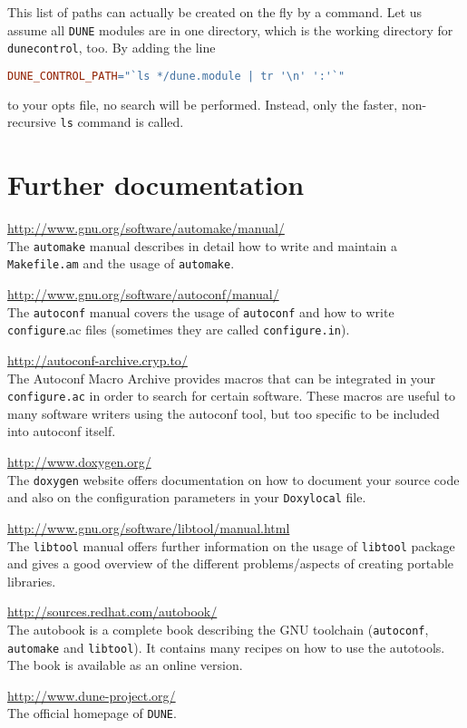 \documentclass[11pt,a4paper,headinclude,footinclude,DIV16,normalheadings]{scrartcl}
\newcommand{\dune}{\texttt{DUNE}\xspace}
\newcommand{\autoconf}{\texttt{autoconf}\xspace}
\newcommand{\automake}{\texttt{automake}\xspace}
\newcommand{\libtool}{\texttt{libtool}\xspace}
\newcommand{\configure}{\texttt{configure}\xspace}
\newcommand{\configureac}{\texttt{configure.ac}\xspace}
\newcommand{\makefileam}{\texttt{Makefile.am}\xspace}
\newcommand{\dunecontrol}{\texttt{dunecontrol}\xspace}
\begin{document}
This list of paths can actually be created on the fly by a command.
Let us assume all \dune modules are in one directory, which is the working directory 
for \dunecontrol, too. By adding the line
\begin{lstlisting}[language=make,showstringspaces=false]
DUNE_CONTROL_PATH="`ls */dune.module | tr '\n' ':'`"
\end{lstlisting}
to your opts file, no search will be performed.  Instead, only the faster, non-recursive 
\texttt{ls} command is called.

\section{Further documentation}

\url{http://www.gnu.org/software/automake/manual/}\\
The \automake manual describes in detail how to write and maintain a
\makefileam and the usage of \automake.

\url{http://www.gnu.org/software/autoconf/manual/}\\
The \autoconf manual covers the usage of \autoconf and how to write
\configure.ac files (sometimes they are called \texttt{configure.in}).

\url{http://autoconf-archive.cryp.to/}\\
The Autoconf Macro Archive provides macros that can be integrated in
your \configureac in order to search for certain software. These
macros are useful to many software writers using the autoconf tool, but too
specific to be included into autoconf itself.

\url{http://www.doxygen.org/}\\
The \texttt{doxygen} website offers documentation on how to document
your source code and also on the configuration parameters in your
\texttt{Doxylocal} file.

\url{http://www.gnu.org/software/libtool/manual.html}\\
The \libtool manual offers further information on the usage of
\libtool package and gives a good overview of the different
problems/aspects of creating portable libraries.

\url{http://sources.redhat.com/autobook/}\\
The autobook is a complete book describing the GNU toolchain
(\autoconf, \automake and \libtool). It contains many recipes on how
to use the autotools. The book is available as an online 
version.

\url{http://www.dune-project.org/}\\
The official homepage of \dune.
\end{document}
